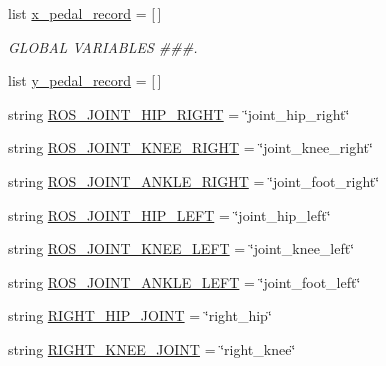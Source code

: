 \begin{DoxyCompactItemize}
list \mbox{\hyperlink{namespacepedal__simulation__interpolation_a711d314f0e420403475b9c1e6f9a569c}{x\+\_\+pedal\+\_\+record}} = \mbox{[}$\,$\mbox{]}
\begin{DoxyCompactList}\small\item\em G\+L\+O\+B\+AL V\+A\+R\+I\+A\+B\+L\+ES \#\#\#. \end{DoxyCompactList}\item 
list \mbox{\hyperlink{namespacepedal__simulation__interpolation_a38da2eb828982649d6c5a08b1e483211}{y\+\_\+pedal\+\_\+record}} = \mbox{[}$\,$\mbox{]}
\item 
string \mbox{\hyperlink{namespacepedal__simulation__interpolation_a41dc6e49ff1bdd37cce517e27bed80e0}{R\+O\+S\+\_\+\+J\+O\+I\+N\+T\+\_\+\+H\+I\+P\+\_\+\+R\+I\+G\+HT}} = \char`\"{}joint\+\_\+hip\+\_\+right\char`\"{}
\item 
string \mbox{\hyperlink{namespacepedal__simulation__interpolation_aa9680c96e946f11497fe78ff96ba9168}{R\+O\+S\+\_\+\+J\+O\+I\+N\+T\+\_\+\+K\+N\+E\+E\+\_\+\+R\+I\+G\+HT}} = \char`\"{}joint\+\_\+knee\+\_\+right\char`\"{}
\item 
string \mbox{\hyperlink{namespacepedal__simulation__interpolation_af4d006b4d3a3a6cd26ca687abdb136e8}{R\+O\+S\+\_\+\+J\+O\+I\+N\+T\+\_\+\+A\+N\+K\+L\+E\+\_\+\+R\+I\+G\+HT}} = \char`\"{}joint\+\_\+foot\+\_\+right\char`\"{}
\item 
string \mbox{\hyperlink{namespacepedal__simulation__interpolation_adf3dc452462570e51ce0ec5bcd4d1686}{R\+O\+S\+\_\+\+J\+O\+I\+N\+T\+\_\+\+H\+I\+P\+\_\+\+L\+E\+FT}} = \char`\"{}joint\+\_\+hip\+\_\+left\char`\"{}
\item 
string \mbox{\hyperlink{namespacepedal__simulation__interpolation_ac77b2277ae9b32d1f9e7c9be94c9a029}{R\+O\+S\+\_\+\+J\+O\+I\+N\+T\+\_\+\+K\+N\+E\+E\+\_\+\+L\+E\+FT}} = \char`\"{}joint\+\_\+knee\+\_\+left\char`\"{}
\item 
string \mbox{\hyperlink{namespacepedal__simulation__interpolation_a2b7409e5f6532321a709d76dc02adb66}{R\+O\+S\+\_\+\+J\+O\+I\+N\+T\+\_\+\+A\+N\+K\+L\+E\+\_\+\+L\+E\+FT}} = \char`\"{}joint\+\_\+foot\+\_\+left\char`\"{}
\item 
string \mbox{\hyperlink{namespacepedal__simulation__interpolation_aad473b018fcc9d9c95a44581bd61660d}{R\+I\+G\+H\+T\+\_\+\+H\+I\+P\+\_\+\+J\+O\+I\+NT}} = \char`\"{}right\+\_\+hip\char`\"{}
\item 
string \mbox{\hyperlink{namespacepedal__simulation__interpolation_a61524db0cb3c7fd23db26e1bbeaeef72}{R\+I\+G\+H\+T\+\_\+\+K\+N\+E\+E\+\_\+\+J\+O\+I\+NT}} = \char`\"{}right\+\_\+knee\char`\"{}

\end{DoxyCompactItemize}
